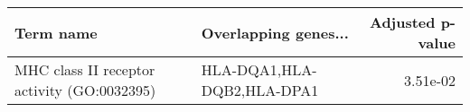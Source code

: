 \begin{tabular}{llr}
\toprule
                                  Term name &       Overlapping genes... &  Adjusted p-value \\
\midrule
MHC class II receptor activity (GO:0032395) & HLA-DQA1,HLA-DQB2,HLA-DPA1 &          3.51e-02 \\
\bottomrule
\end{tabular}
